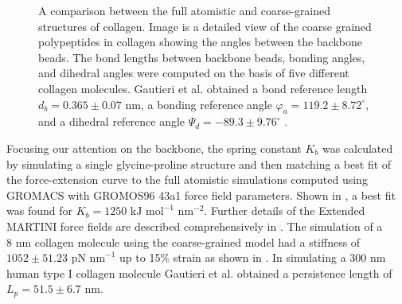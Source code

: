 \begin{figure}[H]
\centering
{}
\hspace{10mm}
\caption{A comparison between the full atomistic and coarse-grained structures of collagen. Image  is a detailed view of the coarse grained polypeptides in collagen showing the angles between the backbone beads. The bond lengths between backbone beads, bonding angles, and dihedral angles were computed on the basis of five different collagen molecules. Gautieri et al. obtained a bond reference length $d_{b} = 0.365 \pm 0.07$ nm, a bonding reference angle $\varphi_{a} = 119.2 \pm 8.72^{\circ}$, and a dihedral reference angle $\Psi_{d} =-89.3 \pm 9.76^{\circ}$ \cite{Gautieri2010}.} 
\label{fig:gautieri_MARTINI_model}
\end{figure}

Focusing our attention on the backbone, the spring constant $K_{b}$ was calculated by simulating a single glycine-proline structure and then matching a best fit of the force-extension curve to the full atomistic simulations computed using GROMACS with GROMOS96 43a1 force field parameters. Shown in , a best fit was found for $K_{b} = 1250 \text{ kJ mol}^{-1} \text{ nm}^{-2}$. Further details of the Extended MARTINI force fields are described comprehensively in \cite{Gautieri2010, Marrink2007, Monticelli2008}. The simulation of a $8 \text{ nm}$ collagen molecule using the coarse-grained model had a stiffness of $1052 \pm 51.23 \text{ pN nm}^{-1}$  up to 15\% strain as shown in . In simulating a 300 nm human type I collagen molecule Gautieri et al. obtained a persistence length of $L_{p}=51.5 \pm 6.7 \text{ nm}$.

